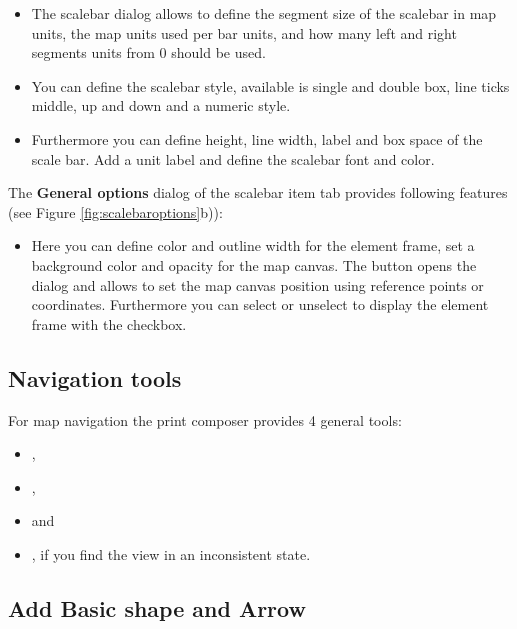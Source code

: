 \begin{itemize}
\item The scalebar dialog allows to define the segment size of the scalebar
in map units, the map units used per bar units, and how many left and right
segments units from 0 should be used.
\item You can define the scalebar style, available is single and double box,
line ticks middle, up and down and a numeric style.
\item Furthermore you can define height, line width, label and box space of
the scale bar. Add a unit label and define the scalebar font and color.
\end{itemize}


The \textbf{General options} dialog of the scalebar item tab provides following
features (see Figure \ref{fig:scalebaroptions}b)):

\begin{itemize}
\item Here you can define color and outline width for the element frame, set
a background color and opacity for the map canvas. The 
button opens the  dialog and allows to set the map
canvas position using reference points or coordinates. Furthermore you can
select or unselect to display the element frame with the  checkbox.
\end{itemize}

\subsection{Navigation tools}

For map navigation the print composer provides 4 general tools:

\begin{itemize}
\item {},
\item {},
\item {} and
\item {}, if you find the view in an
inconsistent state.
\end{itemize}

\subsection{Add Basic shape and Arrow}

